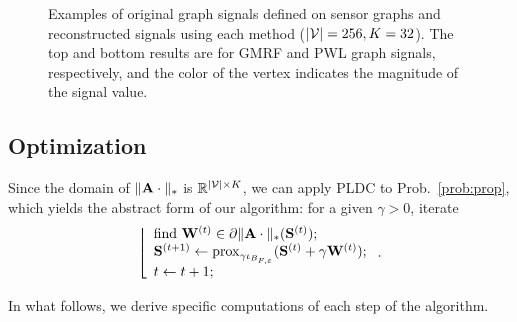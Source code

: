 \documentclass[10pt,journal]{IEEEtran}
\theoremstyle{plain}
\begin{document}
\begin{figure}[!t]
\begin{center}
    \vspace*{-0.4cm}
    \end{center}
    \caption{Examples of original graph signals defined on sensor graphs and reconstructed signals using each method ($|\mathcal{V}|=256, K=32$). The top and bottom results are for GMRF and PWL graph signals, respectively, and the color of the vertex indicates the magnitude of the signal value.}
    \label{AMSEofPWL}
    \vspace{-4mm}
  \end{figure}

\subsection{Optimization}
Since the domain of $\|\mathbf{A}\cdot\|_*$ is $\mathbb{R}^{|\mathcal{V}| \times K}$, we can apply PLDC to Prob.~\eqref{prob:prop}, which yields the abstract form of our algorithm: for a given $\gamma>0$, iterate
\begin{equation}
    \label{eq:propDCA}
    \left\lfloor
    \begin{array}{l}
        \mbox{find } \mathbf{W}^{(t)} \in \partial \|\mathbf{A}\cdot\|_{*}(\mathbf{S}^{(t)}); \\
        \mathbf{S}^{(t + 1)} \leftarrow \mathrm{prox}_{\gamma \iota_{B_{F,\varepsilon}}}(\mathbf{S}^{(t)} + \gamma\mathbf{W}^{(t)});\\
        t \leftarrow t + 1;
    \end{array}
    \right..
\end{equation}

In what follows, we derive specific computations of each step of the algorithm.
\end{document}
